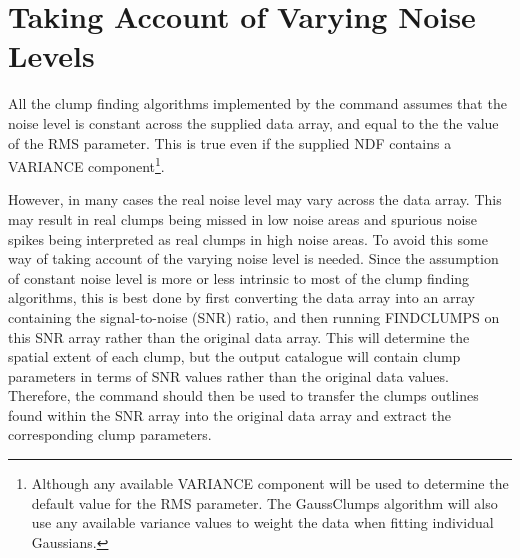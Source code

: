 \documentclass[twoside,11pt]{starlink}
\begin{document}
\section{Taking Account of Varying Noise Levels}

All the clump finding algorithms implemented by the
 command assumes that the noise level is
constant across the supplied data array, and equal to the the value of
the RMS parameter. This is true even if the supplied NDF contains a
VARIANCE component\footnote{Although any available VARIANCE component
will be used to determine the default value for the RMS parameter. The
GaussClumps algorithm will also use any available variance values to
weight the data when fitting individual Gaussians.}.

However, in many cases the real noise level may vary across the data
array. This may result in real clumps being missed in low noise areas and
spurious noise spikes being interpreted as real clumps in high noise
areas. To avoid this some way of taking account of the varying noise
level is needed. Since the assumption of constant noise level is more or
less intrinsic to most of the clump finding algorithms, this is best done
by first converting the data array into an array containing the
signal-to-noise (SNR) ratio, and then running FINDCLUMPS on this SNR array
rather than the original data array. This will determine the spatial
extent of each clump, but the output catalogue will contain clump
parameters in terms of SNR values rather than the original data values.
Therefore, the  command should then
be used to transfer the clumps outlines found within the SNR array into
the original data array and extract the corresponding clump parameters.
\end{document}
